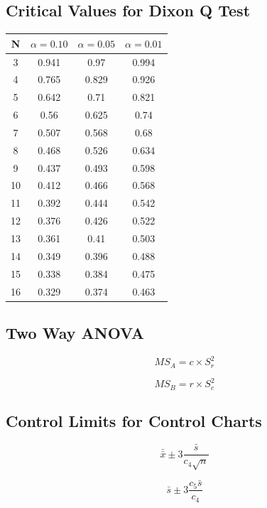 \documentclass[a4paper,12pt]{article}
\begin{document}
	\subsection*{Critical Values for Dixon Q Test}
	{
		\Large
		\begin{center}
			\begin{tabular}{|c|c|c|c|}
				\hline  N  & $\alpha=0.10$  & $\alpha=0.05$  & $\alpha=0.01$  \\ \hline
				3  & 0.941 & 0.97  & 0.994 \\ \hline
				4  & 0.765 & 0.829 & 0.926 \\ \hline
				5  & 0.642 & 0.71  & 0.821 \\ \hline
				6  & 0.56  & 0.625 & 0.74  \\ \hline
				7  & 0.507 & 0.568 & 0.68  \\ \hline
				8  & 0.468 & 0.526 & 0.634 \\ \hline
				9  & 0.437 & 0.493 & 0.598 \\ \hline
				10 & 0.412 & 0.466 & 0.568 \\ \hline
				11 & 0.392 & 0.444 & 0.542 \\ \hline
				12 & 0.376 & 0.426 & 0.522 \\ \hline
				13 & 0.361 & 0.41  & 0.503 \\ \hline
				14 & 0.349 & 0.396 & 0.488 \\ \hline
				15 & 0.338 & 0.384 & 0.475 \\ \hline
				16 & 0.329 & 0.374 & 0.463 \\ \hline
			\end{tabular} 
		\end{center}
	}

\subsection*{Two Way ANOVA}
\begin{multicols}{2}
	
\[MS_A = c \times S^2_r\]

\[MS_B = r \times S^2_c\]
\end{multicols}
\subsection*{Control Limits for Control Charts}

\[ \bar{\bar{x}} \pm 3\frac{\bar{s}}{c_4\sqrt{n}}\]

\[ \bar{s} \pm 3\frac{c_5\bar{s}}{c_4}\]
\end{document}
